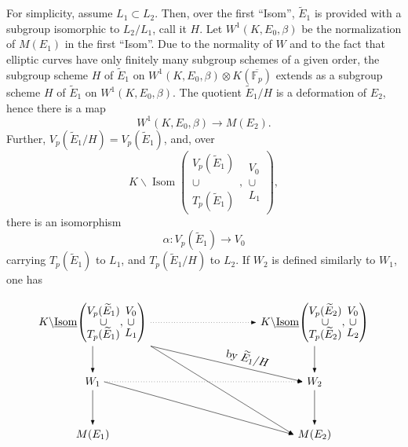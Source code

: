 \documentclass[11pt]{article}
\newcommand{\Fp}{\mathbb{F}_{p}}
\newcommand{\Isom}{\operatorname{Isom}}
\newcommand{\wt}{\widetilde}
\begin{document}
For simplicity, assume \(L_1\subset L_2\). Then, over the first ``Isom'', \(\wt E_1\) is provided with a subgroup isomorphic to \(L_2/L_1\), call it \(H\). Let \(W^1(K,E_0,\beta)\) be the normalization of \(M(E_1)\) in the first ``Isom''. Due to the normality of \(W\) and to the fact that elliptic curves have only finitely many subgroup schemes of a given order, the subgroup scheme \(H\) of \(\wt E_1\) on \(W^1(K,E_0,\beta)\otimes K(\overline{\Fp})\) extends as a subgroup scheme \(H\) of \(\wt E_1\) on \(W^1(K,E_0,\beta)\). The quotient \(\wt E_1/H\) is a deformation of \(E_2\), hence there is a map
\[
W^1(K,E_0,\beta)\longrightarrow M(E_2).
\]
Further, \(V_p(\wt E_1/H)=V_p(\wt E_1)\), and, over
\[
K\backslash\Isom\!\left(
\begin{matrix}V_p(\wt E_1)\\[-2pt]\cup\\[-2pt]T_p(\wt E_1)\end{matrix},
\begin{matrix}V_0\\[-2pt]\cup\\[-2pt]L_1\end{matrix}\right),
\]
there is an isomorphism
\[
\alpha:V_p(\wt E_1)\to V_0
\]
carrying \(T_p(\wt E_1)\) to \(L_1\), and \(T_p(\wt E_1/H)\) to \(L_2\). If \(W_2\) is defined similarly to \(W_1\), one has

\[
\begin{tikzpicture}[x=1cm,y=1cm,>=Latex,baseline=(current bounding box.center)]
  \node (A) at (0,3.15) {$K\backslash\underline{\operatorname{Isom}}\!\left(\begin{matrix}V_p(\widetilde E_1)\\[-2pt]\cup\\[-2pt]T_p(\widetilde E_1)\end{matrix},\begin{matrix}V_0\\[-2pt]\cup\\[-2pt]L_1\end{matrix}\right)$};
  \node (B) at (7.1,3.15) {$K\backslash\underline{\operatorname{Isom}}\!\left(\begin{matrix}V_p(\widetilde E_2)\\[-2pt]\cup\\[-2pt]T_p(\widetilde E_2)\end{matrix},\begin{matrix}V_0\\[-2pt]\cup\\[-2pt]L_2\end{matrix}\right)$};
  \node (W1) at (0,1.25) {$W_1$};
  \node (W2) at (7.1,1.25) {$W_2$};
  \node (M1) at (0,-0.45) {$M(E_1)$};
  \node (M2) at (7.1,-0.45) {$M(E_2)$};
  \draw[->] (A) -- (W1);
  \draw[->] (B) -- (W2);
  \draw[->] (W1) -- (M1);
  \draw[->] (W2) -- (M2);
  \draw[dotted,->] (A) -- (B);
  \draw[dotted,->] (W1) -- (W2);
  \draw[->] (A.south east) -- node[pos=.62,above,sloped] {by $\widetilde E_1/H$} (W2.west);
  \draw[->] (A.south east) -- (M2.west);
  \draw[->] (W1.east) -- (M2.west);
\end{tikzpicture}
\]
\end{document}
